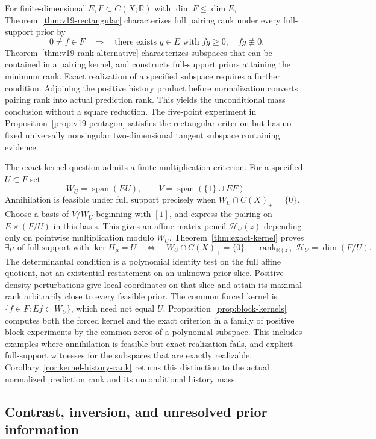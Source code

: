 \documentclass[11pt]{amsart}
\theoremstyle{definition}\newtheorem{definition}[theorem]{Definition}
\theoremstyle{remark}\newtheorem{remark}[theorem]{Remark}
\newcommand{\R}{\mathbb R}\newcommand{\N}{\mathbb N}\newcommand{\C}{\mathbb C}
\DeclareMathOperator{\spanop}{span}\DeclareMathOperator{\rank}{rank}
\begin{document}
For finite-dimensional $E,F\subset C(X;\R)$ with $\dim F\le\dim E$,
Theorem~\ref{thm:v19-rectangular} characterizes full pairing rank
under every full-support prior by
\[
 0\ne f\in F\quad\Longrightarrow\quad
 \text{there exists }g\in E\text{ with }fg\ge0,\quad fg\not\equiv0.
\]
Theorem~\ref{thm:v19-rank-alternative} characterizes subspaces that
can be contained in a pairing kernel, and constructs full-support priors
attaining the minimum rank. Exact realization of a specified subspace
requires a further condition.
Adjoining the positive history product before normalization converts
pairing rank into actual prediction rank. This yields the unconditional
mass conclusion without a square reduction. The five-point experiment
in Proposition~\ref{prop:v19-pentagon} satisfies the rectangular
criterion but has no fixed universally nonsingular two-dimensional
tangent subspace containing evidence.


The exact-kernel question admits a finite multiplication criterion.
For a specified $U\subset F$ set
\[
 W_U=\spanop(EU),\qquad V=\spanop(\{1\}\cup EF).
\]
Annihilation is feasible under full support precisely when
$W_U\cap C(X)_+=\{0\}$. Choose a basis of $V/W_U$ beginning with
$[1]$, and express the pairing on $E\times(F/U)$ in this basis. This
gives an affine matrix pencil $\mathscr H_U(z)$ depending only on
pointwise multiplication modulo $W_U$. Theorem~\ref{thm:exact-kernel}
proves
\[
 \exists\mu\text{ of full support with }\ker H_\mu=U
 \quad\Longleftrightarrow\quad
 W_U\cap C(X)_+=\{0\},\quad
 \rank_{\R(z)}\mathscr H_U=\dim(F/U).
\]
The determinantal condition is a polynomial identity test on the full
affine quotient, not an existential restatement on an unknown prior
slice. Positive density perturbations give local coordinates on that
slice and attain its maximal rank arbitrarily close to every feasible
prior. The common forced kernel is
$\{f\in F:Ef\subset W_U\}$, which need not equal $U$.
Proposition~\ref{prop:block-kernels} computes both the forced kernel
and the exact criterion in a family of positive block experiments by
the common zeros of a polynomial subspace. This includes examples where
annihilation is feasible but exact realization fails, and explicit
full-support witnesses for the subspaces that are exactly realizable.
Corollary~\ref{cor:kernel-history-rank} returns this distinction to the
actual normalized prediction rank and its unconditional history mass.

\subsection{Contrast, inversion, and unresolved prior information}
\end{document}
